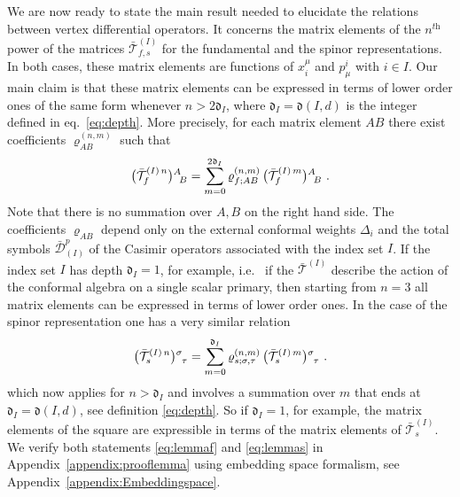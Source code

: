 \documentclass{article}
\def\dep{\mathfrak{d}}
\begin{document}
We are now ready to state the main result needed to elucidate the relations between vertex differential operators. It concerns the matrix elements of the $n^\textit{th}$ 
power of the matrices $\bar{\mathcal{T}}^{(I)}_{f,s}$ 
for the fundamental and the spinor representations. In both cases, these 
matrix elements are functions of $x_i^\mu$ and $p_\mu^i$ with $i \in I$. 
Our main claim is that these matrix elements can be expressed in terms of 
lower order ones of the same form whenever $n > 2\dep_I$, where $\dep_I = \dep(I,d)$ 
is the integer defined in eq.\ \eqref{eq:depth}. More precisely, for each matrix 
element $AB$ there exist coefficients $\varrho^{(n,m)}_{AB}$ such that 
\begin{equation}
\label{eq:lemmaf}
    \bigl(\bar{\mathcal{T}}^{(I)\, n}_f\bigr)\null^{A}_{\;\;B} = \sum_{m=0}^{2\dep_I} 
  \varrho^{(n,m)}_{f;AB}\, \bigl(\bar{\mathcal{T}}^{(I)\, m}_f\bigr)\null^{A}_{\;\;B}\ .  
\end{equation} 
Note that there is no summation over $A,B$ on the right hand side. The coefficients
$\varrho_{AB}$ depend only on the external conformal weights $\Delta_i$ and the 
total symbols $\bar{\mathcal{D}}^p_{(I)}$ of the Casimir operators associated 
with the index set $I$. If the index set $I$ has depth $\dep_I=1$, for example, i.e.
\ if the $\bar{\mathcal{T}}^{(I)}$ describe the action of the conformal algebra on 
a single scalar primary, then starting from $n=3$ all matrix elements can be expressed 
in terms of lower order ones. In the case of the spinor representation one has a 
very similar relation
\begin{equation}
\label{eq:lemmas}
  \bigl(\bar{\mathcal{T}}^{(I)\, n}_s\bigr)\null^{\sigma}_{\;\;\tau} = \sum_{m=0}^{\dep_I} 
  \varrho^{(n, m)}_{s;\sigma,\tau}\, \bigl(\bar{\mathcal{T}}^{(I)\, m}_s\bigr)\null^{\sigma}_{\;\;\tau}\ . 
\end{equation} 
which now applies for $n > \dep_I$ and involves a summation over $m$ that ends 
at $\dep_I = \dep(I,d)$, see definition \eqref{eq:depth}. So if $\dep_I=1$, for 
example, the matrix elements of the square are expressible in terms of the matrix 
elements of $\bar{\mathcal{T}}^{(I)}_s$. We verify both statements
\eqref{eq:lemmaf} and \eqref{eq:lemmas} in Appendix~\ref{appendix:prooflemma} using embedding 
space formalism, see Appendix~\ref{appendix:Embeddingspace}. 
\medskip  
 
\end{document}
